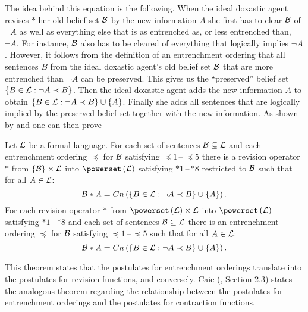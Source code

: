 The idea behind this equation is the following. When the ideal doxastic agent revises $*$ her old belief set $\cal B$ by the new information $A$ she first has to clear $\cal B$ of $\neg A$ as well as everything else that is as entrenched as, or less entrenched than, $\neg A$. For instance, $\cal B$ also has to be cleared of everything that logically implies $\neg A$. However, it follows from the definition of an entrenchment ordering that all sentences $B$ from the ideal doxastic agent's old belief set $\cal B$ that are more entrenched than $\neg A$ can be preserved. This gives us the ``preserved'' belief set $\left\{B\in\begin{cal}L\end{cal}:\neg A\prec B\right\}$. Then the ideal doxastic agent adds the new information $A$ to obtain $\left\{B\in\begin{cal}L\end{cal}:\neg A\prec B\right\}\cup\left\{A\right\}$. Finally she adds all sentences that are logically implied by the preserved belief set together with the new information. As shown by \citet{g88b} and \citet{gm88} one can then prove
\begin{theorem}\label{th1}
Let $\cal L$ be a formal language. For each set of sentences $\cal B\subseteq L$ and each entrenchment ordering $\preceq$ for $\cal B$ satisfying $\preceq \!\! 1$\,--\,$\preceq \!\! 5$ there is a revision operator $*$ from $\left\{\cal B\right\}\times\cal L$ into $\powerset\left(\cal L\right)$ satisfying $*1$\,--\,$*8$ restricted to $\cal B$ such that for all $A\in\cal L$:
$$\begin{cal}B\end{cal}*A=Cn\left(\left\{B\in\begin{cal}L\end{cal}:\neg A\prec B\right\}\cup\left\{A\right\}\right).$$
For each revision operator $*$ from $\powerset\left(\cal L\right)\times\cal L$ into $\powerset\left(\cal L\right)$ satisfying $*1$\,--\,$*8$ and each set of sentences $\cal B\subseteq L$ there is an entrenchment ordering $\preceq$ for $\cal B$ satisfying $\preceq \! 1$\,--\,$\preceq \! 5$ such that for all $A\in\cal L$:
$$\begin{cal}B\end{cal}*A=Cn\left(\left\{B\in\begin{cal}L\end{cal}:\neg A\prec B\right\}\cup\left\{A\right\}\right).$$
\end{theorem}
This theorem states that the postulates for entrenchment orderings translate into the postulates for revision functions, and conversely. Caie (, Section 2.3) states the analogous theorem regarding the relationship between the postulates for entrenchment orderings and the postulates for contraction functions.

